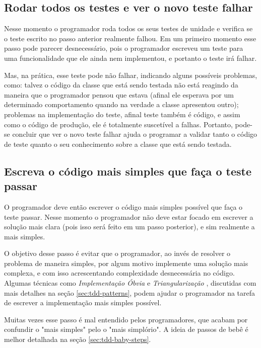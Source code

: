 \subsection{Rodar todos os testes e ver o novo teste falhar}

Nesse momento o programador roda todos os seus testes de unidade e verifica se o teste escrito no passo anterior realmente falhou. Em um
primeiro momento esse passo pode parecer desnecessário, pois o programador escreveu um teste para uma funcionalidade que ele ainda nem
implementou, e portanto o teste irá falhar. 

Mas, na prática, esse teste pode não falhar, indicando alguns possíveis problemas, como: talvez o código da classe que está sendo testada
não está reagindo da maneira que o programador pensou que estava (afinal ele esperava por um determinado comportamento quando na verdade a
classe apresentou outro); problemas na implementação do teste, afinal teste também é código, e assim como o código de produção, ele é
totalmente suscetível a falhas.
Portanto, pode-se concluir que ver o novo teste falhar ajuda o programar a validar tanto o código de teste quanto o seu conhecimento
sobre a classe que está sendo testada. 

\subsection{Escreva o código mais simples que faça o teste passar}

O programador deve então escrever o código mais simples possível que faça o teste passar. Nesse momento o programador não deve estar
focado em escrever a solução mais clara (pois isso será feito em um passo posterior), e sim realmente a mais simples.

O objetivo desse passo é evitar que o programador, ao invés de resolver o problema de maneira simples, por algum motivo
implemente uma solução mais complexa, e com isso acrescentando complexidade desnecessária no código. Algumas técnicas como
\textit{Implementação Óbvia} e \textit{Triangularização} \cite{TDDByExample}, discutidas com mais detalhes na seção \ref{sec:tdd-patterns}, 
podem ajudar o programador na tarefa de escrever a implementação mais simples possível.

Muitas vezes esse passo é mal entendido pelos programadores, que acabam por confundir o "mais simples" pelo o "mais simplório". 
A ideia de passos de bebê \cite{TDDByExample} é melhor detalhada na seção \ref{sec:tdd-baby-steps}.

